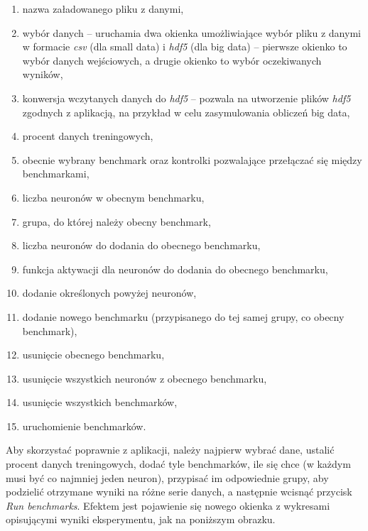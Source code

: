 \documentclass{article}
\begin{document}
\begin{enumerate}
\item nazwa załadowanego pliku z danymi,
\item wybór danych -- uruchamia dwa okienka umożliwiające wybór pliku z danymi w formacie \textit{csv} (dla small data) i \textit{hdf5} (dla big data) -- pierwsze okienko to wybór danych wejściowych, a drugie okienko to wybór oczekiwanych wyników,
\item konwersja wczytanych danych do \textit{hdf5} -- pozwala na utworzenie plików \textit{hdf5} zgodnych z aplikacją, na przykład w celu zasymulowania obliczeń big data,
\item procent danych treningowych,
\item obecnie wybrany benchmark oraz kontrolki pozwalające przełączać się między benchmarkami,
\item liczba neuronów w obecnym benchmarku,
\item grupa, do której należy obecny benchmark,
\item liczba neuronów do dodania do obecnego benchmarku,
\item funkcja aktywacji dla neuronów do dodania do obecnego benchmarku,
\item dodanie określonych powyżej neuronów,
\item dodanie nowego benchmarku (przypisanego do tej samej grupy, co obecny benchmark),
\item usunięcie obecnego benchmarku,
\item usunięcie wszystkich neuronów z obecnego benchmarku,
\item usunięcie wszystkich benchmarków,
\item uruchomienie benchmarków.
\end{enumerate}
Aby skorzystać poprawnie z aplikacji, należy najpierw wybrać dane, ustalić procent danych treningowych, dodać tyle benchmarków, ile się chce (w każdym musi być co najmniej jeden neuron), przypisać im odpowiednie grupy, aby podzielić otrzymane wyniki na różne serie danych, a następnie wcisnąć przycisk \textit{Run benchmarks}. Efektem jest pojawienie się nowego okienka z wykresami opisującymi wyniki eksperymentu, jak na poniższym obrazku.
\end{document}
